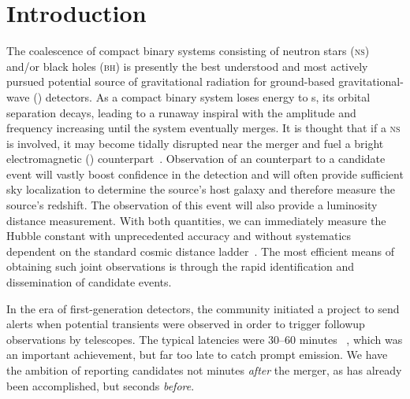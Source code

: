\section{Introduction}
\label{sec:introduction}


The coalescence of compact binary systems consisting of neutron stars
 (\textsc{ns}) and/or black holes (\textsc{bh}) is presently the best
understood and most actively pursued potential source of gravitational
radiation for ground-based gravitational-wave (\GW{}) detectors.
As a compact binary system loses energy to \GW{}s, its
orbital separation decays, leading to a runaway inspiral with the \GW{}
amplitude and frequency increasing until the system eventually merges.  It is
thought that if a \textsc{ns} is involved, it may become tidally disrupted near
the merger and fuel a bright electromagnetic (\EM{})
counterpart~\citep{shibata:2007}. Observation of an \EM{} counterpart to a
candidate \GW{} event will vastly boost confidence in the \GW{} detection and
will often provide sufficient sky localization to determine
the source's host galaxy and therefore measure the source's redshift. The
\GW{} observation of this event will also provide a luminosity
distance measurement. With both quantities, we can
immediately measure the Hubble constant with unprecedented
accuracy and without systematics dependent on the standard cosmic distance
ladder~\citep{2010ApJ...725..496N}. The most efficient means of obtaining
such joint observations is through the rapid identification and dissemination
of candidate \GW{} events.

In the era of first-generation detectors, the \GW{} community initiated a
project to send alerts when potential \GW{} transients were observed in order
to trigger followup observations by \EM{} telescopes.  The typical latencies
were 30--60 minutes ~\citep{HugheyGWPAW2011}, which was an important
achievement, but far too late to catch prompt \EM{} emission. We have the
ambition of reporting \GW{} candidates not minutes \emph{after} the merger, as
has already been accomplished, but seconds \emph{before}.

